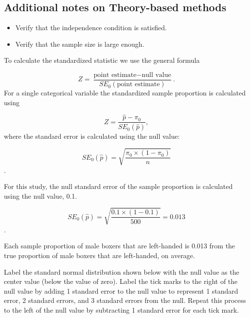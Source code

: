 \documentclass[
]{report}
\providecommand{\tightlist}{%
  \setlength{\itemsep}{0pt}\setlength{\parskip}{0pt}}
\begin{document}
\subsection*{Additional notes on Theory-based methods}\label{additional-notes-on-theory-based-methods}

\vspace{1.4in}

\begin{itemize}
\tightlist
\item
  Verify that the independence condition is satisfied.
\end{itemize}

\vspace{0.3in}

\begin{itemize}
\tightlist
\item
  Verify that the sample size is large enough.
\end{itemize}

\vspace{0.5in}

To calculate the standardized statistic we use the general formula

\[
Z = \frac{\text{point estimate} - \text{null value}}{SE_0(\text{point estimate})}.
\]
For a single categorical variable the standardized sample proportion is calculated using

\[
Z = \frac{\hat{p} - \pi_0}{SE_0(\hat{p})},
\]
where the standard error is calculated using the null value:

\[SE_0(\hat{p})=\sqrt{\frac{\pi_0\times(1-\pi_0)}{n}}\].

For this study, the null standard error of the sample proportion is calculated using the null value, 0.1.

\[SE_0(\hat{p})=\sqrt{\frac{0.1\times(1-0.1)}{500}} = 0.013\].

Each sample proportion of male boxers that are left-handed is 0.013 from the true proportion of male boxers that are left-handed, on average.

\newpage

Label the standard normal distribution shown below with the null value as the center value (below the value of zero). Label the tick marks to the right of the null value by adding 1 standard error to the null value to represent 1 standard error, 2 standard errors, and 3 standard errors from the null. Repeat this process to the left of the null value by subtracting 1 standard error for each tick mark.
\end{document}
